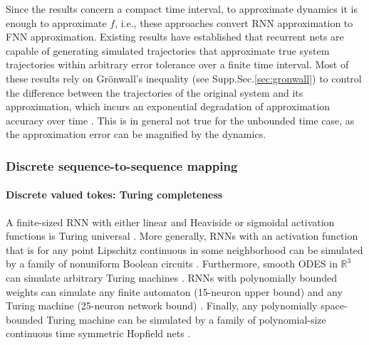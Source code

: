 \documentclass{article}
\newcommand{\reals}{\mathbb{R}}
\newcounter{ct}
\begin{document}
Since the results concern a compact time interval, to approximate dynamics it is enough to approximate $f$, i.e., these approaches convert RNN approximation to FNN approximation.
Existing results have established that recurrent nets are capable of generating simulated trajectories that approximate true system trajectories within arbitrary error tolerance over a finite time interval.
Most of these results rely on Gr\"{o}nwall’s inequality (see Supp.Sec.\ref{sec:gronwall}) to control the difference between the trajectories of the original system and its approximation, which incurs an exponential degradation of approximation accuracy over time
 \citep{sontag1992neural, sontag1998learning, funahashi1993approximation, chow2000modeling, li2005approximation}.
This is in general not true for the unbounded time case, as the approximation error can be magnified by the dynamics.


\subsubsection{Discrete sequence-to-sequence mapping}\label{sec:discrete}
\paragraph{Discrete valued tokes: Turing completeness}

A finite-sized RNN with either linear and Heaviside or sigmoidal activation functions is Turing universal  \citep{pollack1991induction, siegelmann1992computational,kilian1996universality}.
More generally, RNNs with an activation function that is for any point Lipschitz continuous in some neighborhood can be simulated by a family of nonuniform Boolean circuits \citep{siegelmann1994analog}.
Furthermore, smooth ODES in $\reals^3$ can simulate arbitrary Turing machines  \citep{branicky1995universal}. %
RNNs with polynomially bounded weights can simulate any finite automaton (15-neuron upper bound) and any Turing machine (25-neuron network bound)  \citep{indyk1995optimal}.
Finally, any polynomially space-bounded Turing machine can be simulated by a family of polynomial-size continuous time symmetric Hopfield nets  \citep{sima2003continuous}.
\end{document}
